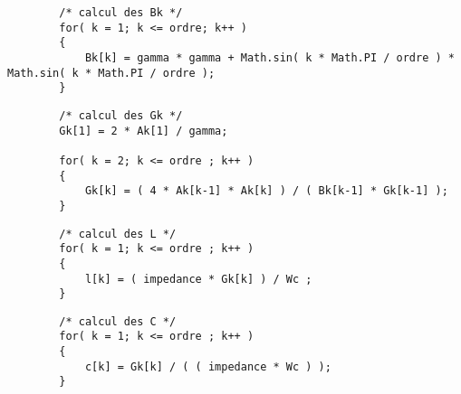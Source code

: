 \documentclass[a4paper,11pt]{report}
\begin{document}
    \begin{lstlisting}
        /* calcul des Bk */
        for( k = 1; k <= ordre; k++ )
        {
            Bk[k] = gamma * gamma + Math.sin( k * Math.PI / ordre ) * Math.sin( k * Math.PI / ordre );
        }
    \end{lstlisting}


    \begin{lstlisting}
        /* calcul des Gk */
        Gk[1] = 2 * Ak[1] / gamma;

        for( k = 2; k <= ordre ; k++ )
        {
            Gk[k] = ( 4 * Ak[k-1] * Ak[k] ) / ( Bk[k-1] * Gk[k-1] );
        }
    \end{lstlisting}


    \begin{lstlisting}
        /* calcul des L */
        for( k = 1; k <= ordre ; k++ )
        {
            l[k] = ( impedance * Gk[k] ) / Wc ;
        }
    \end{lstlisting}


    \begin{lstlisting}
        /* calcul des C */
        for( k = 1; k <= ordre ; k++ )
        {
            c[k] = Gk[k] / ( ( impedance * Wc ) );
        }
    \end{lstlisting}
\end{document}
